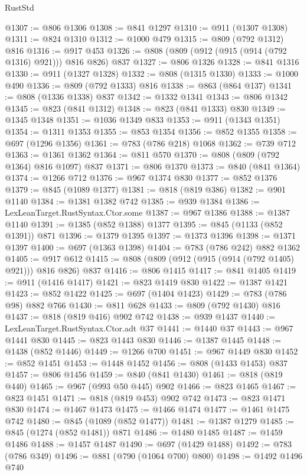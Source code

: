 \begin{lexlean}{RustStd}
\begin{coremodule}
@1307 := @806 @1306
@1308 := @841 @1297
@1310 := @911 (@1307 @1308)
@1311 := @824 @1310
@1312 := @1000 @479
@1315 := @809 (@792 @1312) @816
@1316 := @917 @453
@1326 := @808 (@809 (@912 (@915 (@914 (@792 @1316) @921))) @816 @826) @837
@1327 := @806 @1326
@1328 := @841 @1316
@1330 := @911 (@1327 @1328)
@1332 := @808 (@1315 @1330)
@1333 := @1000 @490
@1336 := @809 (@792 @1333) @816
@1338 := @863 (@864 @137)
@1341 := @808 (@1336 @1338) @837
@1342 := @1332 @1341
@1343 := @806 @1342
@1345 := @823 (@841 @1312)
@1348 := @823 (@841 @1333) @830
@1349 := @1345 @1348
@1351 := @1036 @1349 @833
@1353 := @911 (@1343 @1351)
@1354 := @1311 @1353
@1355 := @853 @1354
@1356 := @852 @1355
@1358 := @697 (@1296 @1356)
@1361 := @783 (@786 @218) @1068
@1362 := @739 @712
@1363 := @1361 @1362
@1364 := @811 @570
@1370 := @808 (@809 (@792 @1364) @816 @1097) @837
@1371 := @806 @1370
@1373 := @840 (@841 @1364)
@1374 := @1266 @712
@1376 := @967 @1374 @830
@1377 := @852 @1376
@1379 := @845 (@1089 @1377)
@1381 := @818 (@819 @386)
@1382 := @901 @1140
@1384 := @1381 @1382 @742
@1385 := @939 @1384
@1386 := LexLeanTarget.RustSyntax.Ctor.some
@1387 := @967 @1386
@1388 := @1387 @1140
@1391 := @1385 (@852 @1388) @1377
@1395 := @845 (@1133 (@852 @1391)) @871
@1396 := @1379 @1395
@1397 := @1373 @1396
@1398 := @1371 @1397
@1400 := @697 (@1363 @1398)
@1404 := @783 (@786 @242) @882 @1362
@1405 := @917 @612
@1415 := @808 (@809 (@912 (@915 (@914 (@792 @1405) @921))) @816 @826) @837
@1416 := @806 @1415
@1417 := @841 @1405
@1419 := @911 (@1416 @1417)
@1421 := @823 @1419 @830
@1422 := @1387 @1421
@1423 := @852 @1422
@1425 := @697 (@1404 @1423)
@1429 := @783 (@786 @98) @882 @766
@1430 := @811 @628
@1433 := @809 (@792 @1430) @816
@1437 := @818 (@819 @416) @902 @742
@1438 := @939 @1437
@1440 := LexLeanTarget.RustSyntax.Ctor.adt @37
@1441 := @1440 @37
@1443 := @967 @1441 @830
@1445 := @823 @1443 @830
@1446 := @1387 @1445
@1448 := @1438 (@852 @1446)
@1449 := @1266 @700
@1451 := @967 @1449 @830
@1452 := @852 @1451
@1453 := @1448 @1452
@1456 := @808 (@1433 @1453) @837
@1457 := @806 @1456
@1459 := @840 (@841 @1430)
@1461 := @818 (@819 @440)
@1465 := @967 (@993 @50 @445) @902
@1466 := @823 @1465
@1467 := @823 @1451
@1471 := @818 (@819 @453) @902 @742
@1473 := @823 @1471 @830
@1474 := @1467 @1473
@1475 := @1466 @1474
@1477 := @1461 @1475 @742
@1480 := @845 (@1089 (@852 @1477))
@1481 := @1387 @1279
@1485 := @845 (@1274 (@852 @1481)) @871
@1486 := @1480 @1485
@1487 := @1459 @1486
@1488 := @1457 @1487
@1490 := @697 (@1429 @1488)
@1492 := @783 (@786 @349)
@1496 := @881 (@790 (@1064 @700) @800)
@1498 := @1492 @1496 @740

\end{coremodule}
\end{lexlean}
